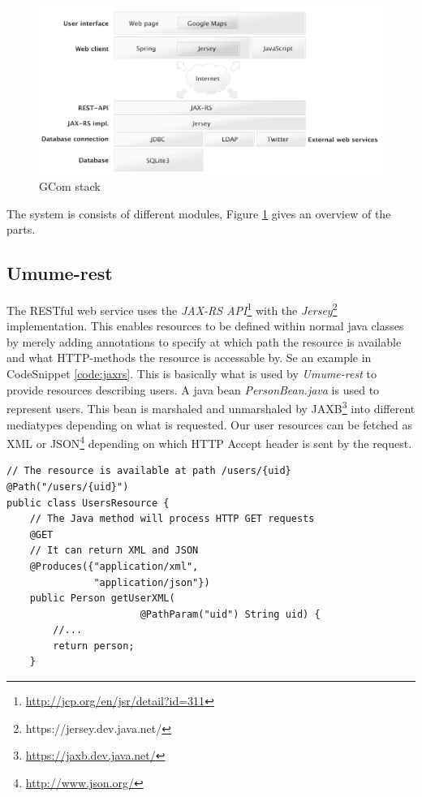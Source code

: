 \documentclass[titlepage, twocolumn, a4paper, 10pt]{article}
\begin{document}
\begin{figure}[!bht]
  \centerline{\includegraphics[width=140mm]{images/systemarchitecture.jpg}}
  \caption{GCom stack}
  \label{fig:images/sysarch}
\end{figure}

The system is consists of different modules, Figure \ref{fig:images/sysarch} gives an overview of the parts.

\subsection{Umume-rest}\label{sec:umume-rest}
The RESTful web service uses the \textit{JAX-RS
  API}\footnote{\url{http://jcp.org/en/jsr/detail?id=311}} with the
\textit{Jersey}\footnote{https://jersey.dev.java.net/} implementation.
This enables resources to be defined within normal java classes by
merely adding annotations to specify at which path the resource is
available and what HTTP-methods the resource is accessable by. Se an
example in CodeSnippet \ref{code:jaxrs}. This is basically what is
used by \textit{Umume-rest} to provide resources describing users. A
java bean \textit{PersonBean.java} is used to represent users. This
bean is marshaled and unmarshaled by
JAXB\footnote{\url{https://jaxb.dev.java.net/}} into different
mediatypes depending on what is requested. Our user resources can be
fetched as XML or JSON\footnote{\url{http://www.json.org/}} depending
on which HTTP Accept header is sent by the request.

\begin{code}
  \begin{footnotesize}
\begin{verbatim}
// The resource is available at path /users/{uid}
@Path("/users/{uid}")
public class UsersResource {
    // The Java method will process HTTP GET requests
    @GET
    // It can return XML and JSON
    @Produces({"application/xml",
               "application/json"})
    public Person getUserXML(
                       @PathParam("uid") String uid) {
        //...
        return person;
    }
\end{verbatim}
  \end{footnotesize}
  \caption{JAX-RS resource}\label{code:jaxrs}
\end{code}
\end{document}

